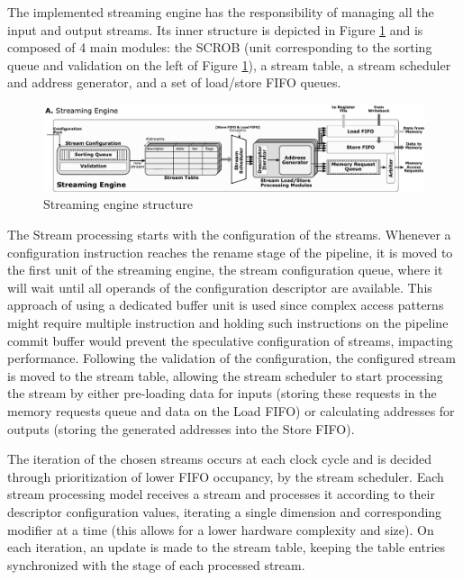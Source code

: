 The implemented streaming engine has the responsibility of managing all the input and output streams. Its inner structure is depicted in Figure \ref{fig:uve-engine} and is composed of 4 main modules: the \acrfull{SCROB} (unit corresponding to the sorting queue and validation on the left of Figure \ref{fig:uve-engine}), a stream table, a stream scheduler and address generator, and a set of load/store FIFO queues.

\begin{figure}[H]
	\begin{center}
 		\includegraphics[width=0.97\linewidth]{images/uve-engine.pdf}
 		\caption{Streaming engine structure}
 		\label{fig:uve-engine}
	\end{center} 
\end{figure}


The Stream processing starts with the configuration of the streams. Whenever a configuration instruction reaches the rename stage of the pipeline, it is moved to the first unit of the streaming engine, the stream configuration queue, where it will wait until all operands of the configuration descriptor are available. This approach of using a dedicated buffer unit is used since complex access patterns might require multiple instruction and holding such instructions on the pipeline commit buffer would prevent the speculative configuration of streams, impacting performance. Following the validation of the configuration, the configured stream is moved to the stream table, allowing the stream scheduler to start processing the stream by either pre-loading data for inputs (storing these requests in the memory requests queue and data on the Load FIFO) or calculating addresses for outputs (storing the generated addresses into the Store FIFO). 

The iteration of the chosen streams occurs at each clock cycle and is decided through prioritization of lower FIFO occupancy, by the stream scheduler. Each stream processing model receives a stream and processes it according to their descriptor configuration values, iterating a single dimension and corresponding modifier at a time (this allows for a lower hardware complexity and size).  On each iteration, an update is made to the stream table, keeping the table entries synchronized with the stage of each processed stream. 



